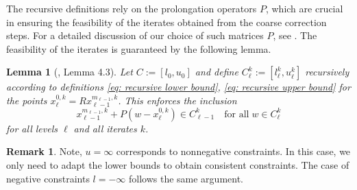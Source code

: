 \documentclass[11pt,reqno]{amsart}
\numberwithin{equation}{section}
\numberwithin{figure}{section}
\theoremstyle{plain}
\newtheorem{lemma}[theorem]{Lemma}
\theoremstyle{definition}
\newtheorem{remark}[theorem]{Remark}
\newcommand{\vphi}{\varphi}
\DeclareMathOperator{\dom}{dom}
\begin{document}
The recursive definitions rely on the prolongation operators $P$, which are crucial in ensuring the feasibility of the iterates obtained from the coarse correction steps. For a detailed discussion of our choice of such matrices $P$, see . The feasibility of the iterates is guaranteed by the following lemma.
\begin{lemma}[\cite{Gratton:2008}, Lemma 4.3]\label{lm: gratton}
    Let $C := [l_0, u_0]$ and define $C_{\ell}^k := [l_\ell^k, u_\ell^k]$ recursively according to definitions \eqref{eq: recursive lower bound}, \eqref{eq: recursive upper bound} for the points $x_\ell^{0,k}=Rx_{\ell-1}^{m_{\ell-1},k}$. This enforces the inclusion
    \begin{equation}
        x_{\ell-1}^{m_{\ell-1}, k} + P(w - x_{\ell}^{0,k}) \in C_{\ell-1}^k \quad \text{for all} \; w \in C_{\ell}^k
    \end{equation}
    for all levels $\ell$ and all iterates $k$.
\end{lemma}
\begin{remark}
    Note, $u = \infty$ corresponds to nonnegative constraints. In this case, we only need to adapt the lower bounds to obtain consistent constraints. The case of negative constraints $l = - \infty$ follows the same argument.
\end{remark}
\end{document}
